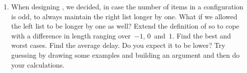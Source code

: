 \begin{enumerate}
  \item When designing , we decided, in case the
    number of items in a configuration is odd, to always maintain the
    right list longer by one. What if we allowed the left list to be
    longer by one as well? Extend the definition of 
    so to cope with a difference in length ranging over~\(-1\),
    \(0\)~and~\(1\). Find the best and worst cases. Find the average
    delay. Do you expect it to be lower? Try guessing by drawing some
    examples and building an argument and then do your calculations.

\end{enumerate}
